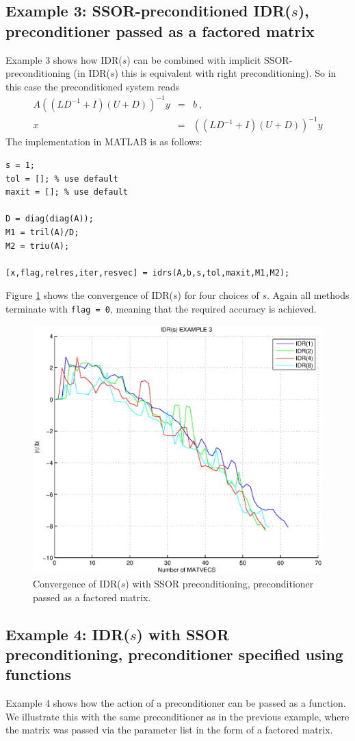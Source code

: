 \documentclass[prodmode,acmtoms]{acmsmall}
\begin{document}
\subsection{Example 3: SSOR-preconditioned IDR($s$), preconditioner passed as a factored matrix}
Example 3 shows how IDR($s$) can be combined with implicit SSOR-preconditioning (in IDR($s$) this
is equivalent with right preconditioning). So in this case the preconditioned system reads
\begin{eqnarray}\nonumber
  A ((LD^{-1}+I)(U + D))^{-1} y &=&  b ~,\\
  x &=& ((LD^{-1}+I)(U + D))^{-1} y
\end{eqnarray}
The implementation in MATLAB is as follows:
\begin{verbatim}
s = 1;
tol = []; % use default
maxit = []; % use default

D = diag(diag(A));
M1 = tril(A)/D;
M2 = triu(A);

[x,flag,relres,iter,resvec] = idrs(A,b,s,tol,maxit,M1,M2);
\end{verbatim}

Figure \ref{fig:example3} shows the convergence of IDR($s$) for four choices of $s$. Again all methods terminate
with {\tt flag = 0}, meaning that the required accuracy is achieved.
\begin{figure}
\centering
\includegraphics[width=.60\linewidth]{example3}
\caption{Convergence of IDR($s$) with SSOR preconditioning, preconditioner passed as a factored matrix.}
\label{fig:example3}
\end{figure}

\subsection{Example 4: IDR($s$) with SSOR preconditioning, preconditioner specified using functions}
Example 4 shows how the action of a  preconditioner can be passed as a function. We illustrate this with the
same preconditioner as in the previous example, where the matrix was passed via the parameter list in the form of 
a factored matrix.
\end{document}
